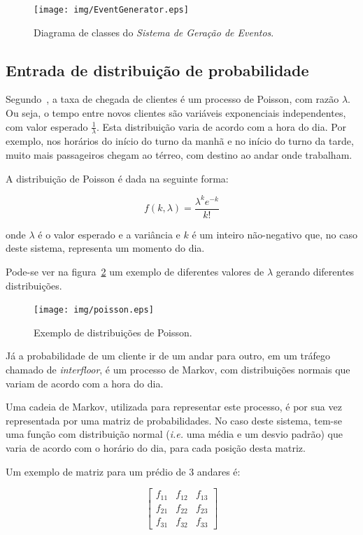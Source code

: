 \begin{figure}[htb!]
  \centering
  \texttt{[image: img/EventGenerator.eps]}
  \caption{Diagrama de classes do \textit{Sistema de Geração de Eventos}.}
\label{fig:diagram:generator}
\end{figure}

\subsection{\label{chap:input}Entrada de distribuição de probabilidade}

Segundo~\cite{Ross:2006:IPM:1197141}, a taxa de chegada de clientes é um
processo de Poisson, com razão $\lambda$. Ou seja, o tempo entre novos clientes
são variáveis exponenciais independentes, com valor esperado
$\frac{1}{\lambda}$. Esta distribuição varia de acordo com a hora do dia. Por
exemplo, nos horários do início do turno da manhã e no início do turno da tarde,
muito mais passageiros chegam ao térreo, com destino ao andar onde trabalham.

A distribuição de Poisson é dada na seguinte forma:

\[f(k,\lambda) = \frac{\lambda^{k}e^{-k}}{k!}\]

onde $\lambda$ é o valor esperado e a variância e $k$ é um inteiro não-negativo que, no caso
deste sistema, representa um momento do dia.

Pode-se ver na figura~\ref{fig:distribution:poisson} um exemplo de diferentes
valores de $\lambda$ gerando diferentes distribuições.

\begin{figure}[htb!]
  \centering
  \texttt{[image: img/poisson.eps]}
  \caption{Exemplo de distribuições de Poisson.}
\label{fig:distribution:poisson}
\end{figure}

Já a probabilidade de um cliente ir de um andar para outro, em um tráfego
chamado de \textit{interfloor}, é um processo de Markov, com distribuições
normais que variam de acordo com a hora do dia.

Uma cadeia de Markov, utilizada para representar este processo, é por sua vez
representada por uma matriz de probabilidades. No caso deste sistema, tem-se uma
função com distribuição normal (\textit{i.e.} uma média e um desvio padrão) que
varia de acordo com o horário do dia, para cada posição desta matriz.

Um exemplo de matriz para um prédio de 3 andares é:

\[
  \begin{bmatrix}
    f_{11} & f_{12} & f_{13} \\
    f_{21} & f_{22} & f_{23} \\
    f_{31} & f_{32} & f_{33}
  \end{bmatrix}
\]

